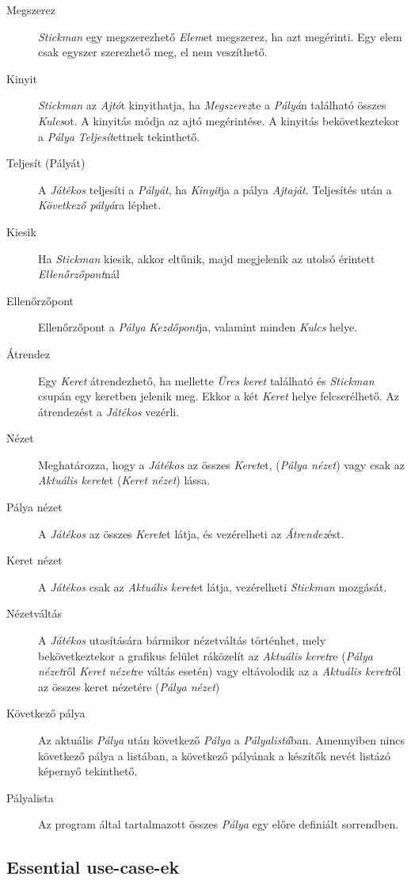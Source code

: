\begin{description}
    \item[Megszerez] \emph{Stickman} egy megszerezhető \emph{Elem}et megszerez, ha azt megérinti. Egy elem csak egyszer szerezhető meg, el nem veszíthető.
    \item[Kinyit] \emph{Stickman} az \emph{Ajtó}t kinyithatja, ha \emph{Megszerez}te a \emph{Pályá}n található összes \emph{Kulcs}ot. A kinyitás módja az ajtó megérintése. A kinyitás bekövetkeztekor a \emph{Pálya} \emph{Teljesít}ettnek tekinthető.
    \item[Teljesít (Pályát)] A \emph{Játékos} teljesíti a \emph{Pályát}, ha \emph{Kinyit}ja a pálya \emph{Ajtaját}. Teljesítés után a \emph{Következő pályá}ra léphet.
    \item[Kiesik] Ha \emph{Stickman} kiesik, akkor eltűnik, majd megjelenik az utolsó érintett \emph{Ellenőrzőpont}nál
    \item[Ellenőrzőpont] Ellenőrzőpont a \emph{Pálya} \emph{Kezdőpont}ja, valamint minden \emph{Kulcs} helye.
    \item[Átrendez] Egy \emph{Keret} átrendezhető, ha mellette \emph{Üres keret} található és \emph{Stickman} csupán egy keretben jelenik meg. Ekkor a két \emph{Keret} helye felcserélhető. Az átrendezést a \emph{Játékos} vezérli.
    \item[Nézet] Meghatározza, hogy a \emph{Játékos} az összes \emph{Keret}et, (\emph{Pálya nézet}) vagy csak az \emph{Aktuális keret}et (\emph{Keret nézet}) lássa.
    \item[Pálya nézet] A \emph{Játékos} az összes \emph{Keret}et látja, és vezérelheti az \emph{Átrendez}ést.
    \item[Keret nézet] A \emph{Játékos} csak az \emph{Aktuális keret}et látja, vezérelheti \emph{Stickman} mozgását.
    \item[Nézetváltás] A \emph{Játékos} utasítására bármikor nézetváltás történhet, mely bekövetkeztekor a grafikus felület ráközelít az \emph{Aktuális keret}re (\emph{Pálya nézet}ről \emph{Keret nézet}re váltás esetén) vagy eltávolodik az a \emph{Aktuális keret}ről az összes keret nézetére (\emph{Pálya nézet})
    \item[Következő pálya] Az aktuális \emph{Pálya} után következő \emph{Pálya} a \emph{Pályalistá}ban. Amennyiben nincs következő pálya a listában, a következő pályának a készítők nevét listázó képernyő tekinthető.
    \item[Pályalista] Az program által tartalmazott összes \emph{Pálya} egy előre definiált sorrendben.

\end{description}

\subsection{Essential use-case-ek}


